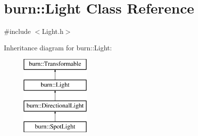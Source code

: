 \hypertarget{classburn_1_1_light}{\section{burn\-:\-:Light Class Reference}
\label{classburn_1_1_light}
}


{\ttfamily \#include $<$Light.\-h$>$}

Inheritance diagram for burn\-:\-:Light\-:\begin{figure}[H]
\begin{center}
\leavevmode
\includegraphics[height=4.000000cm]{classburn_1_1_light}
\end{center}
\end{figure}
